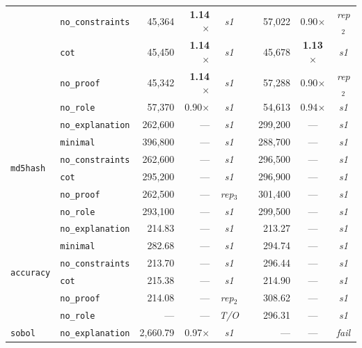 \begin{table}[t]
{\begin{tabular}{@{}llrrcrrcc@{}}
  & \texttt{no\_constraints} & 45{,}364 & \textbf{1.14}$\times$ & \textit{s1} && 57{,}022 & 0.90$\times$          & \textit{rep}$_2$ \\
  & \texttt{cot}             & 45{,}450 & \textbf{1.14}$\times$ & \textit{s1} && 45{,}678 & \textbf{1.13}$\times$ & \textit{s1}      \\
  & \texttt{no\_proof}       & 45{,}342 & \textbf{1.14}$\times$ & \textit{s1} && 57{,}288 & 0.90$\times$          & \textit{rep}$_2$ \\
  & \texttt{no\_role}        & 57{,}370 & 0.90$\times$          & \textit{s1} && 54{,}613 & 0.94$\times$          & \textit{s1}      \\
\midrule
\multirow{6}{*}{\texttt{md5hash}}
  & \texttt{no\_explanation} & 262{,}600 & --- & \textit{s1}      && 299{,}200 & --- & \textit{s1}      \\
  & \texttt{minimal}         & 396{,}800 & --- & \textit{s1}      && 288{,}700 & --- & \textit{s1}      \\
  & \texttt{no\_constraints} & 262{,}600 & --- & \textit{s1}      && 296{,}500 & --- & \textit{s1}      \\
  & \texttt{cot}             & 295{,}200 & --- & \textit{s1}      && 296{,}900 & --- & \textit{s1}      \\
  & \texttt{no\_proof}       & 262{,}500 & --- & \textit{rep}$_3$ && 301{,}400 & --- & \textit{s1}      \\
  & \texttt{no\_role}        & 293{,}100 & --- & \textit{s1}      && 299{,}500 & --- & \textit{s1}      \\
\midrule
\multirow{6}{*}{\texttt{accuracy}}
  & \texttt{no\_explanation} & 214.83 & --- & \textit{s1}       && 213.27 & --- & \textit{s1}      \\
  & \texttt{minimal}         & 282.68 & --- & \textit{s1}       && 294.74 & --- & \textit{s1}      \\
  & \texttt{no\_constraints} & 213.70 & --- & \textit{s1}       && 296.44 & --- & \textit{s1}      \\
  & \texttt{cot}             & 215.38 & --- & \textit{s1}       && 214.90 & --- & \textit{s1}      \\
  & \texttt{no\_proof}       & 214.08 & --- & \textit{rep}$_2$  && 308.62 & --- & \textit{s1}      \\
  & \texttt{no\_role}        &    --- & --- & \textit{T/O}      && 296.31 & --- & \textit{s1}      \\
\midrule
\multirow{6}{*}{\texttt{sobol}}
  & \texttt{no\_explanation} & 2{,}660.79 & 0.97$\times$          & \textit{s1}      &&          --- & ---          & \textit{fail}    \\

\end{tabular}}
\end{table}
